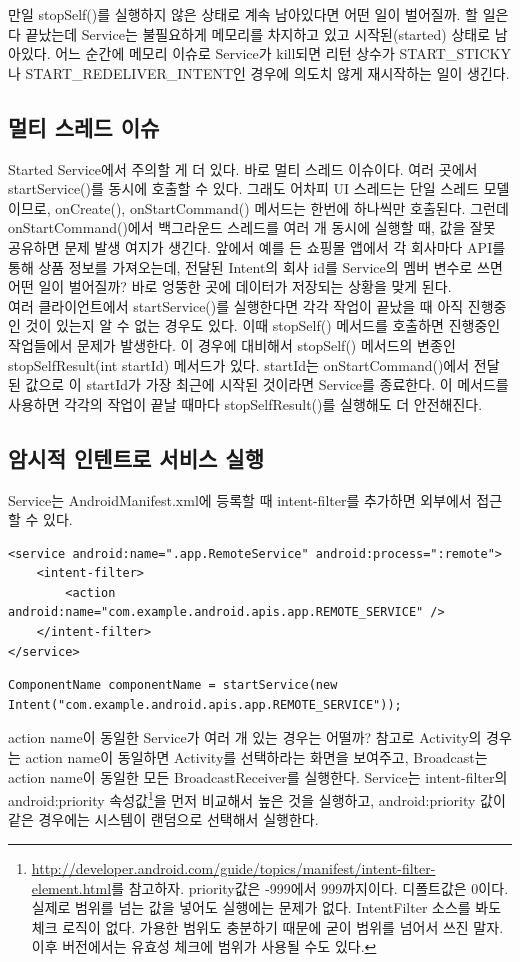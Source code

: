 만일 stopSelf()를 실행하지 않은 상태로 계속 남아있다면 어떤 일이 벌어질까. 할 일은 다 끝났는데 Service는 불필요하게 메모리를 차지하고 있고 시작된(started) 상태로 남아있다. 
어느 순간에 메모리 이슈로 Service가 kill되면 리턴 상수가 START\_STICKY나 START\_REDELIVER\_INTENT인 경우에 의도치 않게 재시작하는 일이 생긴다.

\subsection{멀티 스레드 이슈}
Started Service에서 주의할 게 더 있다. 바로 멀티 스레드 이슈이다. 여러 곳에서 startService()를 동시에 호출할 수 있다. 
그래도 어차피 UI 스레드는 단일 스레드 모델이므로, onCreate(), onStartCommand() 메서드는 한번에 하나씩만 호출된다.
그런데 onStartCommand()에서 백그라운드 스레드를 여러 개 동시에 실행할 때, 값을 잘못 공유하면 문제 발생 여지가 생긴다. 앞에서 예를 든 쇼핑몰 앱에서 각 회사마다 API를 통해 상품 정보를 가져오는데, 전달된 Intent의 회사 id를 Service의 멤버 변수로 쓰면 어떤 일이 벌어질까? 바로 엉뚱한 곳에 데이터가 저장되는 상황을 맞게 된다.\\

여러 클라이언트에서 startService()를 실행한다면 각각 작업이 끝났을 때 아직 진행중인 것이 있는지 알 수 없는 경우도 있다. 이때 stopSelf() 메서드를 호출하면 진행중인 작업들에서 문제가 발생한다. 
이 경우에 대비해서 stopSelf() 메서드의 변종인 stopSelfResult(int startId) 메서드가 있다.  startId는 onStartCommand()에서 전달된 값으로 이 startId가 가장 최근에 시작된 것이라면 Service를 종료한다. 이 메서드를 사용하면 각각의 작업이 끝날 때마다 stopSelfResult()를 실행해도 더 안전해진다.

\subsection{암시적 인텐트로 서비스 실행}
Service는 AndroidManifest.xml에 등록할 때 intent-filter를 추가하면 외부에서 접근할 수 있다.
\begin{lstlisting}[frame=single]
<service android:name=".app.RemoteService" android:process=":remote">
	<intent-filter>
		<action android:name="com.example.android.apis.app.REMOTE_SERVICE" />
	</intent-filter>
</service>
\end{lstlisting}

\begin{lstlisting}[frame=single]
ComponentName componentName = startService(new Intent("com.example.android.apis.app.REMOTE_SERVICE"));
\end{lstlisting}
action name이 동일한 Service가 여러 개 있는 경우는 어떨까? 참고로 Activity의 경우는 action name이 동일하면 Activity를 선택하라는 화면을 보여주고, Broadcast는 action name이 동일한 모든 BroadcastReceiver를 실행한다.
Service는 intent-filter의 android:priority 속성값\footnote{\url{http://developer.android.com/guide/topics/manifest/intent-filter-element.html}를 참고하자. priority값은 -999에서 999까지이다. 디폴트값은 0이다. 실제로 범위를 넘는 값을 넣어도 실행에는 문제가 없다. IntentFilter 소스를 봐도 체크 로직이 없다. 가용한 범위도 충분하기 때문에 굳이 범위를 넘어서 쓰진 말자. 이후 버전에서는 유효성 체크에 범위가 사용될 수도 있다.}을 먼저 비교해서 높은 것을 실행하고, android:priority 값이 같은 경우에는 시스템이 랜덤으로 선택해서 실행한다.

